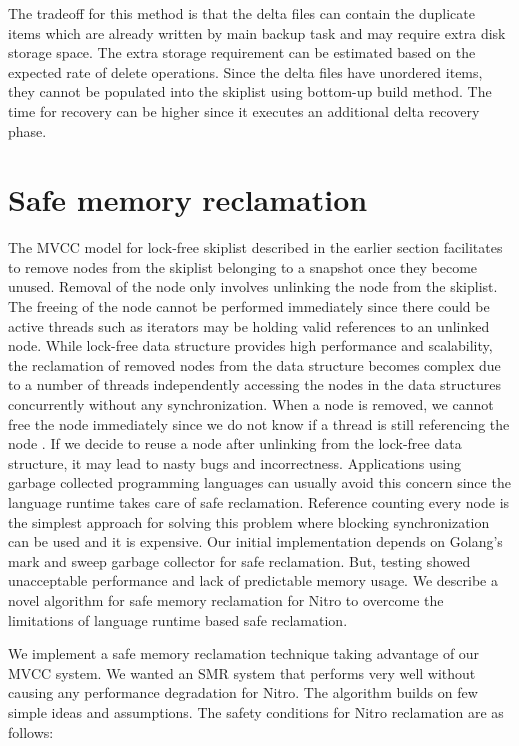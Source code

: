 \documentclass{vldb}
\begin{document}
The tradeoff for this method is that the delta files can contain the duplicate items which are already written by main backup task and may require extra disk storage space. The extra storage requirement can be estimated based on the expected rate of delete operations. Since the delta files have unordered items, they cannot be populated into the skiplist using bottom-up build method. The time for recovery can be higher since it executes an additional delta recovery phase.

\section{Safe memory reclamation}
The MVCC model for lock-free skiplist described in the earlier section facilitates to remove nodes from the skiplist belonging to a snapshot once they become unused. Removal of the node only involves unlinking the node from the skiplist. The freeing of the node cannot be performed immediately since there could be active threads such as iterators may be holding valid references to an unlinked node. While lock-free data structure provides high performance and scalability, the reclamation of removed nodes from the data structure becomes complex due to  a number of threads independently accessing the nodes in the data structures concurrently without any synchronization. When a node is removed, we cannot free the node immediately since we do not know if a thread is still referencing the node \cite{hp,ebr}. If we decide to reuse a node after unlinking from the lock-free data structure, it may lead to nasty bugs and incorrectness. Applications using garbage collected programming languages can usually avoid this concern since the language runtime takes care of safe reclamation. Reference counting every node is the simplest approach for solving this problem where blocking synchronization can be used and it is expensive. Our initial implementation depends on Golang's mark and sweep garbage collector for safe reclamation. But, testing showed unacceptable performance and lack of predictable memory usage. We describe a novel algorithm for safe memory reclamation for Nitro to overcome the limitations of language runtime based safe reclamation.

We implement a safe memory reclamation technique taking advantage of our MVCC system. We wanted an SMR system that performs very well without causing any performance degradation for Nitro. The algorithm builds on few simple ideas and assumptions. The safety conditions for Nitro reclamation are as follows:
\end{document}
